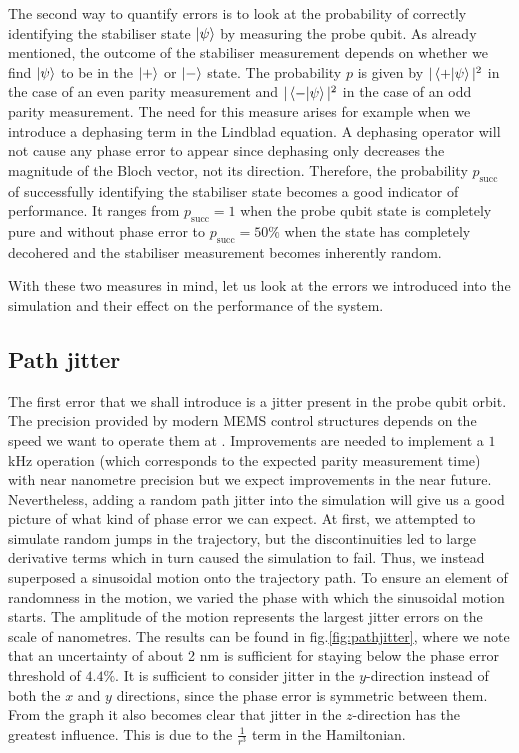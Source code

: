 The second way to quantify errors is to look at the probability of correctly identifying the stabiliser state  $\ket{\psi}$ by measuring the probe qubit. As already mentioned, the outcome of the stabiliser measurement depends on whether we find $\ket{\psi}$ to be in the $\ket{+}$ or $\ket{-}$ state. The probability $p$ is given by $|\left\langle +|\psi \right\rangle|^2$ in the case of an even parity measurement and $|\left\langle - |\psi \right\rangle|^2$ in the case of an odd parity measurement. The need for this measure arises for example when we introduce a dephasing term in the Lindblad equation. A dephasing operator will not cause any phase error to appear since dephasing only decreases the magnitude of the Bloch vector, not its direction. Therefore, the probability $p_{\mathrm{succ}}$ of successfully identifying the stabiliser state becomes a good indicator of performance. It ranges from $p_{\mathrm{succ}} = 1$ when the probe qubit state is completely pure and without phase error to $p_{\mathrm{succ}} = 50 \%$ when the state has completely decohered and the stabiliser measurement becomes inherently random. %

With these two measures in mind, let us look at the errors we introduced into the simulation and their effect on the performance of the system. 




\subsection{Path jitter}\label{sec:jitter}
The first error that we shall introduce is a jitter present in the probe qubit orbit. The precision provided by modern MEMS control structures depends on the speed we want to operate them at \cite{Chu2003,Koo2012}. Improvements are needed to implement a $1\, $kHz operation (which corresponds to the expected parity measurement time) with near nanometre precision but we expect improvements in the near future. Nevertheless, adding a random path jitter into the simulation will give us a good picture of what kind of phase error we can expect. At first, we attempted to simulate random jumps in the trajectory, but the discontinuities led to large derivative terms which in turn caused the simulation to fail. Thus,  we instead superposed a sinusoidal motion onto the trajectory path. To ensure an element of randomness in the motion, we varied the phase with which the sinusoidal motion starts. The amplitude of the motion represents the largest jitter errors on the scale of nanometres. The results can be found in fig.\@ \ref{fig:pathjitter}, where we note that an uncertainty of about 2 nm is sufficient for staying below the phase error threshold of $4.4 \%$.  It is sufficient to consider jitter in the $y$-direction instead of both the $x$ and $y$ directions, since the phase error is symmetric between them. 
From the graph it also becomes clear that jitter in the $z$-direction has the greatest influence. This is due to the $\frac{1}{r^3}$  term in the Hamiltonian.



